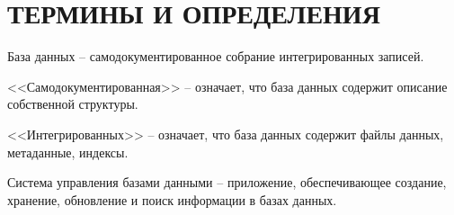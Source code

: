 \chapter*{ТЕРМИНЫ И ОПРЕДЕЛЕНИЯ}

База данных -- самодокументированное собрание интегрированных записей.

<<Самодокументированная>> -- означает, что база данных содержит описание собственной структуры.

<<Интегрированных>> -- означает, что база данных содержит файлы данных, метаданные, индексы. 

Система управления базами данными -- приложение, обеспечивающее создание, хранение, обновление и поиск информации в базах данных.